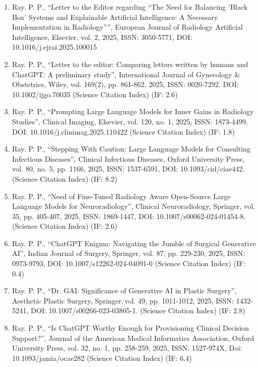 \documentclass[11pt,a4paper]{moderncv}
\begin{document}
\begin{adjustwidth}{6em}{0pt}
\begin{enumerate}
		\item Ray. P. P., “Letter to the Editor regarding “The Need for Balancing 'Black Box' Systems and Explainable Artificial Intelligence: A Necessary Implementation in Radiology””, European Journal of Radiology Artificial Intelligence, Elsevier, vol. 2, 2025, ISSN: 3050-5771, DOI: 10.1016/j.ejrai.2025.100015 
		
		\item Ray. P. P., “Letter to the editor: Comparing letters written by humans and ChatGPT: A preliminary study”, International Journal of Gynecology \& Obstetrics, Wiley, vol. 169(2), pp. 861-862, 2025, ISSN: 0020-7292, DOI: 10.1002/ijgo.70035 (Science Citation Index) (IF: 2.6)
		
		\item Ray. P. P., “Prompting Large Language Models for Inner Gains in Radiology Studies”, Clinical Imaging, Elsevier, vol. 120, no. 1, 2025, ISSN: 1873-4499, DOI: 10.1016/j.clinimag.2025.110422 (Science Citation Index) (IF: 1.8)
		
		\item Ray. P. P., “Stepping With Caution: Large Language Models for Consulting Infectious Diseases”, Clinical Infectious Diseases, Oxford University Press, vol. 80, no. 5, pp. 1166, 2025, ISSN: 1537-6591, DOI: 10.1093/cid/ciae442. (Science Citation Index) (IF: 8.2)
		
		\item Ray. P. P., “Need of Fine-Tuned Radiology Aware Open-Source Large Language Models for Neuroradiology”, Clinical Neuroradiology, Springer, vol. 35, pp. 405-407, 2025, ISSN: 1869-1447, DOI: 10.1007/s00062-024-01454-8. (Science Citation Index) (IF: 2.6)
		
		\item Ray. P. P., “ChatGPT Enigma: Navigating the Jumble of Surgical Generative AI”, Indian Journal of Surgery, Springer, vol. 87, pp. 229-230, 2025, ISSN: 0973-9793, DOI: 10.1007/s12262-024-04091-0 (Science Citation Index) (IF: 0.4)
		
		\item Ray. P. P., “Dr. GAI: Significance of Generative AI in Plastic Surgery”, Aesthetic Plastic Surgery, Springer, vol. 49, pp. 1011-1012, 2025, ISSN: 1432-5241, DOI: 10.1007/s00266-023-03805-1. (Science Citation Index) (IF: 2.8)
		
		\item Ray. P. P., “Is ChatGPT Worthy Enough for Provisioning Clinical Decision Support?”, Journal of the American Medical Informatics Association, Oxford University Press, vol. 32, no. 1, pp. 258-259, 2025, ISSN: 1527-974X, Doi: 10.1093/jamia/ocae282 (Science Citation Index) (IF: 6.4)
		

\end{enumerate}
\end{adjustwidth}
\end{document}
